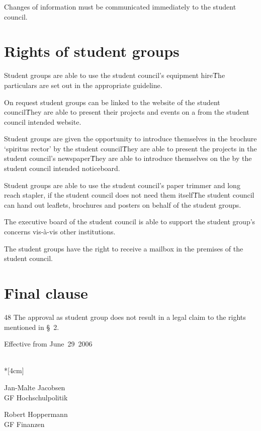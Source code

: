 \begin{multicols}{2}
\Abs \Satz Changes of information must be communicated immediately to the student council.

\section{Rights of student groups} 
\Abs \Satz Student groups are able to use the student council’s equipment hire\. The particulars are set out in the appropriate guideline.

\Abs \Satz On request student groups can be linked to the website of the student council\. They are 
able to present their projects and events on a from the student council intended website. 

\Abs \Satz Student groups are given the opportunity to introduce themselves in the brochure ‘spiritus rector’ by the student council\. They are able to present the projects in the student council’s newspaper\. They are able to introduce themselves on the by the student council intended noticeboard.

\Abs \Satz Student groups are able to use the student council’s paper trimmer and long reach stapler, if the student council does not need them itself\. The student council can hand out leaflets, brochures and posters on behalf of the student groups. 

\Abs \Satz The executive board of the student council is able to support the student group’s concerns vis-à-vis other institutions. 

\Abs \Satz The student groups have the right to receive a mailbox in the premises of the student council. 

\section{Final clause} 
48 \Abs \Satz The approval as student group does not result in a legal claim to the rights mentioned in §~2. 

\end{multicols} 


\vspace{1cm} 

Effective from June~29~2006


\normalsize
~\\*[4cm]
\begin{center}
\hspace*{\fill}
\parbox{7cm}{Jan-Malte Jacobsen\\GF Hochschulpolitik}
\hfill\parbox{7cm}{Robert Hoppermann\\GF Finanzen}\hspace*{\fill}
\end{center}